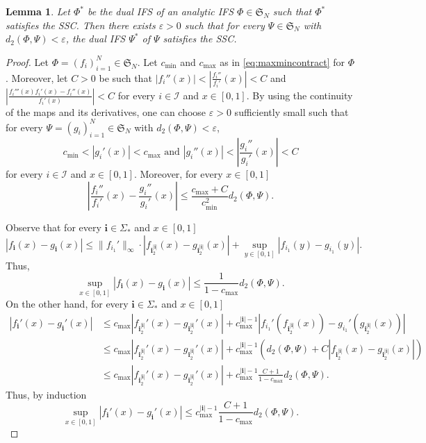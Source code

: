 \documentclass[12pt,]{article}
\def\cref#1{\ref{#1}}%
\newtheorem{lemma}[theorem]{Lemma}
\theoremstyle{definition}
\theoremstyle{remark}
\newcommand{\0}{\mathbf{0}}
\newcommand{\bi}{\mathbf{i}}
\begin{document}
\begin{lemma}\label{lem:cont}
	Let $\Phi^*$ be the dual IFS of an analytic IFS $\Phi\in\mathfrak{S}_N$ such that $\Phi^*$ satisfies the SSC. Then there exists $\varepsilon>0$ such that for every $\Psi\in\mathfrak{S}_N$ with $d_2(\Phi,\Psi)<\varepsilon$, the dual IFS $\Psi^*$ of $\Psi$ satisfies the SSC.
\end{lemma}

\begin{proof}
	Let $\Phi=(f_i)_{i=1}^N\in\mathfrak{S}_N$. Let $c_{\min}$ and $c_{\max}$ as in \cref{eq:maxmincontract} for $\Phi$. Moreover, let $C>0$ be such that $|f_i''(x)|<\left|\frac{f_i''}{f_i'}(x)\right|<C$ and $\left|\frac{f_i'''(x)f_i'(x)-f_i''(x)}{f_i'(x)}\right|<C$ for every $i\in\mathcal{I}$ and $x\in[0,1]$. By using the continuity of the maps and its derivatives, one can choose $\varepsilon>0$ sufficiently small such that for every $\Psi=(g_i)_{i=1}^N\in\mathfrak{S}_N$ with $d_2(\Phi,\Psi)<\varepsilon$, 
	$$
	c_{\min}<|g_i'(x)|<c_{\max}\text{ and } |g_i''(x)|<\left|\frac{g_i''}{g_i'}(x)\right|<C
	$$
	for every $i\in\mathcal{I}$ and $x\in[0,1]$. Moreover, for every $x\in[0,1]$
	\begin{equation}\label{eq:tec1}
	\left|\frac{f_i''}{f_i'}(x)-\frac{g_i''}{g_i'}(x)\right|\leq \frac{c_{\max}+C}{c_{\min}^{2}}d_2(\Phi,\Psi).
	\end{equation}
	
	Observe that for every $\bi\in\Sigma_*$ and $x\in[0,1]$
	$$
	|f_{\bi}(x)-g_{\bi}(x)|\leq\|f_{i_1}'\|_{\infty}\cdot|f_{\bi_2^{|\bi|}}(x)-g_{\bi_2^{|\bi|}}(x)|+\sup_{y\in[0,1]}|f_{i_1}(y)-g_{i_1}(y)|.
	$$ 
	Thus,
	\begin{equation}\label{eq:tec2}
		\sup_{x\in[0,1]}|f_{\bi}(x)-g_{\bi}(x)|\leq \frac{1}{1-c_{\max}}d_2(\Phi,\Psi).
	\end{equation}
	On the other hand, for every $\bi\in\Sigma_*$ and $x\in[0,1]$
	\begin{align*}
	|f_{\bi}'(x)-g_{\bi}'(x)|&\leq c_{\max}|f_{\bi_2^{|\bi|}}'(x)-g_{\bi_2^{|\bi|}}'(x)|+c_{\max}^{|\bi|-1}|f_{i_1}'(f_{\bi_2^{|\bi|}}(x))-g_{i_1}'(g_{\bi_2^{|\bi|}}(x))|\\
	&\leq c_{\max}|f_{\bi_2^{|\bi|}}'(x)-g_{\bi_2^{|\bi|}}'(x)|+c_{\max}^{|\bi|-1}\left(d_2(\Phi,\Psi)+C|f_{\bi_2^{|\bi|}}(x)-g_{\bi_2^{|\bi|}}(x)|\right)\\
	&\leq c_{\max}|f_{\bi_2^{|\bi|}}'(x)-g_{\bi_2^{|\bi|}}'(x)|+c_{\max}^{|\bi|-1}\frac{C+1}{1-c_{\max}}d_2(\Phi,\Psi).
	\end{align*}
	Thus, by induction
	\begin{equation}\label{eq:tec3}
	\sup_{x\in[0,1]}|f_{\bi}'(x)-g_{\bi}'(x)|\leq c_{\max}^{|\bi|-1}\frac{C+1}{1-c_{\max}}d_2(\Phi,\Psi).
	\end{equation}
	

\end{proof}
\end{document}
